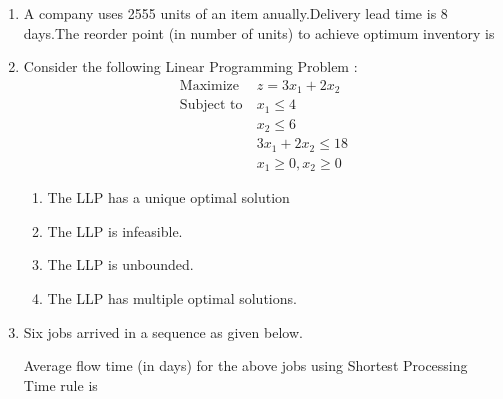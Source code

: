 \documentclass[journal]{IEEEtran}
\begin{document}
\begin{enumerate}
\begin{enumerate}
\end{enumerate}
\item A company uses 2555 units of an item anually.Delivery lead time is 8 days.The reorder point (in number of units) to achieve optimum inventory is 
\begin{enumerate}
\end{enumerate}
\item Consider the following Linear Programming Problem  :
	\begin{align*}
		\text{Maximize} &\ z = 3x_1+2x_2 \\
		\text{Subject to} &\ x_1 \le 4 \\
		&\ x_2 \le 6 \\
		&\  3x_1+2x_2 \le 18 \\
		&\ x_1 \ge 0, x_2 \ge 0  
	\end{align*}
\begin{enumerate}
\item The LLP has a unique optimal solution 
\item The LLP is infeasible.
\item The LLP is unbounded.
\item The LLP has multiple optimal solutions.
\end{enumerate}
\item Six jobs arrived in a sequence as given below.
\begin{table}[h!]
        \centering
  
\end{table}
Average flow time (in days) for the above jobs using Shortest Processing Time rule is 
\begin{enumerate}

\end{enumerate}
\end{enumerate}
\end{document}
